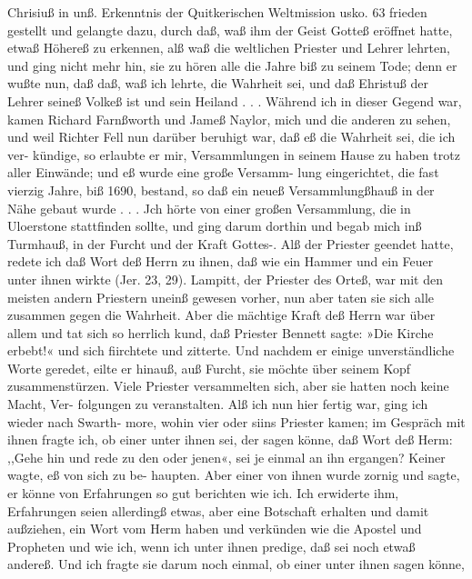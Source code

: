 Chrisiuß in unß. Erkenntnis der Quitkerischen Weltmission usko. 63
frieden gestellt und gelangte dazu, durch daß, waß ihm der Geist
Gotteß eröffnet hatte, etwaß Höhereß zu erkennen, alß waß die
weltlichen Priester und Lehrer lehrten, und ging nicht mehr hin,
sie zu hören alle die Jahre biß zu seinem Tode; denn er wußte
nun, daß daß, waß ich lehrte, die Wahrheit sei, und daß Ehristuß
der Lehrer seineß Volkeß ist und sein Heiland . . . Während ich
in dieser Gegend war, kamen Richard Farnßworth und Jameß
Naylor, mich und die anderen zu sehen, und weil Richter Fell
nun darüber beruhigt war, daß eß die Wahrheit sei, die ich ver-
kündige, so erlaubte er mir, Versammlungen in seinem Hause zu
haben trotz aller Einwände; und eß wurde eine große Versamm-
lung eingerichtet, die fast vierzig Jahre, biß 1690, bestand, so
daß ein neueß Versammlungßhauß in der Nähe gebaut wurde . . .
Jch hörte von einer großen Versammlung, die in Uloerstone
stattfinden sollte, und ging darum dorthin und begab mich inß
Turmhauß, in der Furcht und der Kraft Gottes-. Alß der Priester
geendet hatte, redete ich daß Wort deß Herrn zu ihnen, daß wie ein
Hammer und ein Feuer unter ihnen wirkte (Jer. 23, 29). Lampitt,
der Priester des Orteß, war mit den meisten andern Priestern
uneinß gewesen vorher, nun aber taten sie sich alle zusammen
gegen die Wahrheit. Aber die mächtige Kraft deß Herrn war
über allem und tat sich so herrlich kund, daß Priester Bennett
sagte: »Die Kirche erbebt!« und sich fiirchtete und zitterte. Und
nachdem er einige unverständliche Worte geredet, eilte er hinauß,
auß Furcht, sie möchte über seinem Kopf zusammenstürzen. Viele
Priester versammelten sich, aber sie hatten noch keine Macht, Ver-
folgungen zu veranstalten.
Alß ich nun hier fertig war, ging ich wieder nach Swarth-
more, wohin vier oder siins Priester kamen; im Gespräch mit
ihnen fragte ich, ob einer unter ihnen sei, der sagen könne, daß
Wort deß Herm: ,,Gehe hin und rede zu den oder jenen«, sei je
einmal an ihn ergangen? Keiner wagte, eß von sich zu be-
haupten. Aber einer von ihnen wurde zornig und sagte, er
könne von Erfahrungen so gut berichten wie ich. Ich erwiderte
ihm, Erfahrungen seien allerdingß etwas, aber eine Botschaft
erhalten und damit außziehen, ein Wort vom Herm haben und
verkünden wie die Apostel und Propheten und wie ich, wenn
ich unter ihnen predige, daß sei noch etwaß andereß. Und ich
fragte sie darum noch einmal, ob einer unter ihnen sagen könne,



